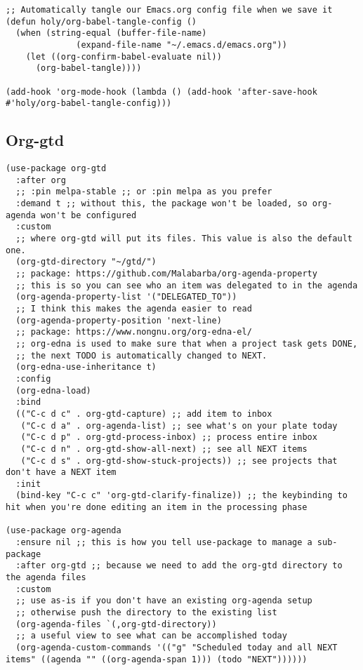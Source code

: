 \documentclass[11pt]{article}
\begin{document}
\begin{verbatim}
;; Automatically tangle our Emacs.org config file when we save it
(defun holy/org-babel-tangle-config ()
  (when (string-equal (buffer-file-name)
		      (expand-file-name "~/.emacs.d/emacs.org"))
    (let ((org-confirm-babel-evaluate nil))
      (org-babel-tangle))))

(add-hook 'org-mode-hook (lambda () (add-hook 'after-save-hook #'holy/org-babel-tangle-config)))

\end{verbatim}
\subsection*{Org-gtd}
\label{sec:org85d8de9}
\begin{verbatim}
(use-package org-gtd
  :after org
  ;; :pin melpa-stable ;; or :pin melpa as you prefer
  :demand t ;; without this, the package won't be loaded, so org-agenda won't be configured
  :custom
  ;; where org-gtd will put its files. This value is also the default one.
  (org-gtd-directory "~/gtd/")
  ;; package: https://github.com/Malabarba/org-agenda-property
  ;; this is so you can see who an item was delegated to in the agenda
  (org-agenda-property-list '("DELEGATED_TO"))
  ;; I think this makes the agenda easier to read
  (org-agenda-property-position 'next-line)
  ;; package: https://www.nongnu.org/org-edna-el/
  ;; org-edna is used to make sure that when a project task gets DONE,
  ;; the next TODO is automatically changed to NEXT.
  (org-edna-use-inheritance t)
  :config
  (org-edna-load)
  :bind
  (("C-c d c" . org-gtd-capture) ;; add item to inbox
   ("C-c d a" . org-agenda-list) ;; see what's on your plate today
   ("C-c d p" . org-gtd-process-inbox) ;; process entire inbox
   ("C-c d n" . org-gtd-show-all-next) ;; see all NEXT items
   ("C-c d s" . org-gtd-show-stuck-projects)) ;; see projects that don't have a NEXT item
  :init
  (bind-key "C-c c" 'org-gtd-clarify-finalize)) ;; the keybinding to hit when you're done editing an item in the processing phase

(use-package org-agenda
  :ensure nil ;; this is how you tell use-package to manage a sub-package
  :after org-gtd ;; because we need to add the org-gtd directory to the agenda files
  :custom
  ;; use as-is if you don't have an existing org-agenda setup
  ;; otherwise push the directory to the existing list
  (org-agenda-files `(,org-gtd-directory))
  ;; a useful view to see what can be accomplished today
  (org-agenda-custom-commands '(("g" "Scheduled today and all NEXT items" ((agenda "" ((org-agenda-span 1))) (todo "NEXT"))))))


\end{verbatim}
\end{document}
